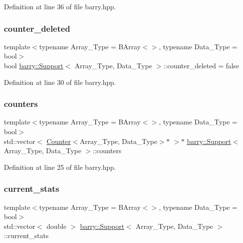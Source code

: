 Definition at line 36 of file barry.\+hpp.

\mbox{\label{classbarry_1_1_support_a96c18c68794e756bc84ee2405dca505a}} 
\subsubsection{\texorpdfstring{counter\+\_\+deleted}{counter\_deleted}}
{\footnotesize\ttfamily template$<$typename Array\+\_\+\+Type  = B\+Array$<$$>$, typename Data\+\_\+\+Type  = bool$>$ \\
bool \hyperlink{classbarry_1_1_support}{barry\+::\+Support}$<$ Array\+\_\+\+Type, Data\+\_\+\+Type $>$\+::counter\+\_\+deleted = false}



Definition at line 30 of file barry.\+hpp.

\mbox{\label{classbarry_1_1_support_ab7cd458219742709c0a214d7bf70b7d9}} 
\subsubsection{\texorpdfstring{counters}{counters}}
{\footnotesize\ttfamily template$<$typename Array\+\_\+\+Type  = B\+Array$<$$>$, typename Data\+\_\+\+Type  = bool$>$ \\
std\+::vector$<$ \hyperlink{classbarry_1_1_counter}{Counter}$<$Array\+\_\+\+Type, Data\+\_\+\+Type$>$$\ast$ $>$$\ast$ \hyperlink{classbarry_1_1_support}{barry\+::\+Support}$<$ Array\+\_\+\+Type, Data\+\_\+\+Type $>$\+::counters}



Definition at line 25 of file barry.\+hpp.

\mbox{\label{classbarry_1_1_support_a094f0851c7d6bfa7876eb0df2be4439e}} 
\subsubsection{\texorpdfstring{current\+\_\+stats}{current\_stats}}
{\footnotesize\ttfamily template$<$typename Array\+\_\+\+Type  = B\+Array$<$$>$, typename Data\+\_\+\+Type  = bool$>$ \\
std\+::vector$<$ double $>$ \hyperlink{classbarry_1_1_support}{barry\+::\+Support}$<$ Array\+\_\+\+Type, Data\+\_\+\+Type $>$\+::current\+\_\+stats}



